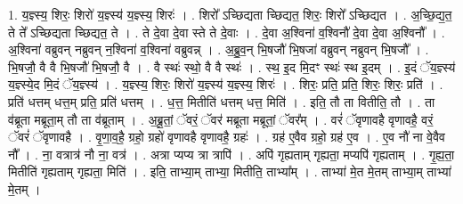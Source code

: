 \documentclass[17pt]{extarticle}
\begin{document}
1. य॒ज्ञ्स्य॒ शिरः॒ शिरो॑ य॒ज्ञ्स्य॑ य॒ज्ञ्स्य॒ शिरः॑ । . शिरो᳚ ऽच्छिद्यता च्छिद्यत॒ शिरः॒ शिरो᳚ ऽच्छिद्यत । . अ॒च्छि॒द्य॒त॒ ते ते᳚ ऽच्छिद्यता च्छिद्यत॒ ते । . ते दे॒वा दे॒वा स्ते ते दे॒वाः । . दे॒वा अ॒श्विना॑ व॒श्विनौ॑ दे॒वा दे॒वा अ॒श्विनौ᳚ । . अ॒श्विना॑ वब्रुवन् नब्रुवन् न॒श्विना॑ व॒श्विना॑ वब्रुवन्न् । . अ॒ब्रु॒व॒न् भि॒षजौ॑ भि॒षजा॑ वब्रुवन् नब्रुवन् भि॒षजौ᳚ । . भि॒षजौ॒ वै वै भि॒षजौ॑ भि॒षजौ॒ वै । . वै स्थः॑ स्थो॒ वै वै स्थः॑ । . स्थ॒ इ॒द मि॒दꣳ स्थः॑ स्थ इ॒दम् । . इ॒दं ॅय॒ज्ञ्स्य॑ य॒ज्ञ्स्ये॒द मि॒दं ॅय॒ज्ञ्स्य॑ । . य॒ज्ञ्स्य॒ शिरः॒ शिरो॑ य॒ज्ञ्स्य॑ य॒ज्ञ्स्य॒ शिरः॑ । . शिरः॒ प्रति॒ प्रति॒ शिरः॒ शिरः॒ प्रति॑ । . प्रति॑ धत्तम् धत्त॒म् प्रति॒ प्रति॑ धत्तम् । . ध॒त्त॒ मितीति॑ धत्तम् धत्त॒ मिति॑ । . इति॒ तौ ता वितीति॒ तौ । . ता व॑ब्रूता मब्रूता॒म् तौ ता व॑ब्रूताम् । . अ॒ब्रू॒तां॒ ॅवरं॒ ॅवर॑ मब्रूता मब्रूतां॒ ॅवर᳚म् । . वरं॑ ॅवृणावहै वृणावहै॒ वरं॒ ॅवरं॑ ॅवृणावहै । . वृ॒णा॒व॒है॒ ग्रहो॒ ग्रहो॑ वृणावहै वृणावहै॒ ग्रहः॑ । . ग्रह॑ ए॒वैव ग्रहो॒ ग्रह॑ ए॒व । . ए॒व नौ॑ ना वे॒वैव नौ᳚ । . ना॒ वत्रात्र॑ नौ ना॒ वत्र॑ । . अत्रा प्यप्य त्रा त्रापि॑ । . अपि॑ गृह्यताम् गृह्यता॒ मप्यपि॑ गृह्यताम् । . गृ॒ह्य॒ता॒ मितीति॑ गृह्यताम् गृह्यता॒ मिति॑ । . इति॒ ताभ्या॒म् ताभ्या॒ मितीति॒ ताभ्या᳚म् । . ताभ्या॑ मे॒त मे॒तम् ताभ्या॒म् ताभ्या॑ मे॒तम् । \newline
\end{document}
